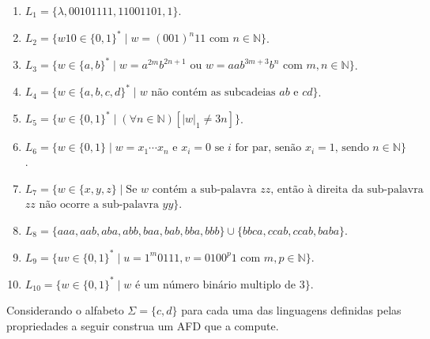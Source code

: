 \begin{enumerate}
	\item $L_1 = \{\lambda, 00101111, 11001101, 1\}$.
	\item $L_2 = \{w10 \in \{0,1\}^* \mid w = (001)^n11 \text{ com } n \in \mathbb{N}\}$.
	\item $L_3 = \{w \in \{a,b\}^* \mid w = a^{2m}b^{2n+1} \text{ ou } w = aab^{3m + 3}b^n \text{ com } m,n \in \mathbb{N}\}$.
	\item $L_4 = \{w \in \{a,b,c,d\}^* \mid w \text{ não contém as subcadeias } ab \text{ e } cd\}$.
	\item $L_5 = \{w \in \{0,1\}^* \mid (\forall n \in \mathbb{N})[|w|_1 \neq 3n]\}$.
	\item $L_6 = \{w \in \{0,1\} \mid w = x_1\cdots x_n \text{ e } x_i = 0 \text{ se } i \text{ for par, senão } x_i = 1 \text{, sendo } n \in \mathbb{N}\}$.
	\item $L_7 = \{w \in \{x, y, z\} \mid \text{Se } w \text{ contém a sub-palavra } zz \text{, então à  direita da sub-palavra }$ $zz \text{ não ocorre a sub-palavra } yy \}$.
	\item $L_8 = \{aaa, aab, aba, abb, baa, bab, bba, bbb\} \cup \{bbca, ccab, ccab, baba\}$.
	\item $L_9 = \{uv \in \{0,1\}^* \mid u = 1^m0111, v = 0100^p1 \text{ com } m, p \in \mathbb{N}\}$.
	\item $L_{10} = \{w \in \{0,1\}^* \mid w \text{ é um número binário multiplo de  } 3\}$.
\end{enumerate}

\begin{exercise}\label{exerc:LR10}
	Considerando o alfabeto $\Sigma = \{c, d\}$ para cada uma das linguagens definidas pelas propriedades a seguir construa um AFD que a compute.
\end{exercise}

